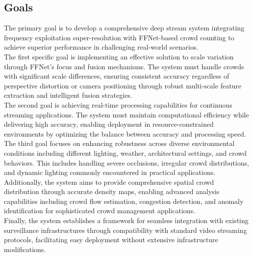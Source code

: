 \subsection{Goals}
The primary goal is to develop a comprehensive deep stream system integrating frequency exploitation super-resolution with FFNet-based crowd counting to achieve superior performance in challenging real-world scenarios.\\
The first specific goal is implementing an effective solution to scale variation through FFNet's focus and fusion mechanisms. The system must handle crowds with significant scale differences, ensuring consistent accuracy regardless of perspective distortion or camera positioning through robust multi-scale feature extraction and intelligent fusion strategies.\\
The second goal is achieving real-time processing capabilities for continuous streaming applications. The system must maintain computational efficiency while delivering high accuracy, enabling deployment in resource-constrained environments by optimizing the balance between accuracy and processing speed.\\
The third goal focuses on enhancing robustness across diverse environmental conditions including different lighting, weather, architectural settings, and crowd behaviors. This includes handling severe occlusions, irregular crowd distributions, and dynamic lighting commonly encountered in practical applications.\\
Additionally, the system aims to provide comprehensive spatial crowd distribution through accurate density maps, enabling advanced analysis capabilities including crowd flow estimation, congestion detection, and anomaly identification for sophisticated crowd management applications.\\
Finally, the system establishes a framework for seamless integration with existing surveillance infrastructures through compatibility with standard video streaming protocols, facilitating easy deployment without extensive infrastructure modifications.